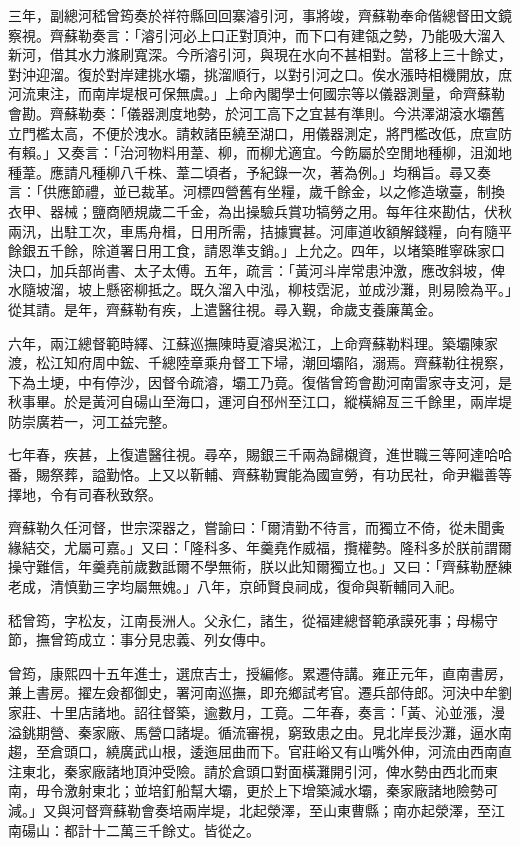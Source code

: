 \begin{pinyinscope}
三年，副總河嵇曾筠奏於祥符縣回回寨濬引河，事將竣，齊蘇勒奉命偕總督田文鏡察視。齊蘇勒奏言：「濬引河必上口正對頂沖，而下口有建瓴之勢，乃能吸大溜入新河，借其水力滌刷寬深。今所濬引河，與現在水向不甚相對。當移上三十餘丈，對沖迎溜。復於對岸建挑水壩，挑溜順行，以對引河之口。俟水漲時相機開放，庶河流東注，而南岸堤根可保無虞。」上命內閣學士何國宗等以儀器測量，命齊蘇勒會勘。齊蘇勒奏：「儀器測度地勢，於河工高下之宜甚有準則。今洪澤湖滾水壩舊立門檻太高，不便於洩水。請敕諸臣繞至湖口，用儀器測定，將門檻改低，庶宣防有賴。」又奏言：「治河物料用葦、柳，而柳尤適宜。今飭屬於空閒地種柳，沮洳地種葦。應請凡種柳八千株、葦二頃者，予紀錄一次，著為例。」均稱旨。尋又奏言：「供應節禮，並已裁革。河標四營舊有坐糧，歲千餘金，以之修造墩臺，制換衣甲、器械；鹽商陋規歲二千金，為出操驗兵賞功犒勞之用。每年往來勘估，伏秋兩汛，出駐工次，車馬舟楫，日用所需，拮據實甚。河庫道收額解錢糧，向有隨平餘銀五千餘，除道署日用工食，請恩準支銷。」上允之。四年，以堵築睢寧硃家口決口，加兵部尚書、太子太傅。五年，疏言：「黃河斗岸常患沖激，應改斜坡，俾水隨坡溜，坡上懸密柳抵之。既久溜入中泓，柳枝霑泥，並成沙灘，則易險為平。」從其請。是年，齊蘇勒有疾，上遣醫往視。尋入覲，命歲支養廉萬金。

六年，兩江總督範時繹、江蘇巡撫陳時夏濬吳淞江，上命齊蘇勒料理。築壩陳家渡，松江知府周中鋐、千總陸章乘舟督工下埽，潮回壩陷，溺焉。齊蘇勒往視察，下為土埂，中有停沙，因督令疏濬，壩工乃竟。復偕曾筠會勘河南雷家寺支河，是秋事畢。於是黃河自碭山至海口，運河自邳州至江口，縱橫綿亙三千餘里，兩岸堤防崇廣若一，河工益完整。

七年春，疾甚，上復遣醫往視。尋卒，賜銀三千兩為歸櫬資，進世職三等阿達哈哈番，賜祭葬，謚勤恪。上又以靳輔、齊蘇勒實能為國宣勞，有功民社，命尹繼善等擇地，令有司春秋致祭。

齊蘇勒久任河督，世宗深器之，嘗諭曰：「爾清勤不待言，而獨立不倚，從未聞夤緣結交，尤屬可嘉。」又曰：「隆科多、年羹堯作威福，攬權勢。隆科多於朕前謂爾操守難信，年羹堯前歲數詆爾不學無術，朕以此知爾獨立也。」又曰：「齊蘇勒歷練老成，清慎勤三字均屬無媿。」八年，京師賢良祠成，復命與靳輔同入祀。

嵇曾筠，字松友，江南長洲人。父永仁，諸生，從福建總督範承謨死事；母楊守節，撫曾筠成立：事分見忠義、列女傳中。

曾筠，康熙四十五年進士，選庶吉士，授編修。累遷侍講。雍正元年，直南書房，兼上書房。擢左僉都御史，署河南巡撫，即充鄉試考官。遷兵部侍郎。河決中牟劉家莊、十里店諸地。詔往督築，逾數月，工竟。二年春，奏言：「黃、沁並漲，漫溢銚期營、秦家廠、馬營口諸堤。循流審視，窮致患之由。見北岸長沙灘，逼水南趨，至倉頭口，繞廣武山根，逶迤屈曲而下。官莊峪又有山嘴外伸，河流由西南直注東北，秦家廠諸地頂沖受險。請於倉頭口對面橫灘開引河，俾水勢由西北而東南，毋令激射東北；並培釘船幫大壩，更於上下增築減水壩，秦家廠諸地險勢可減。」又與河督齊蘇勒會奏培兩岸堤，北起滎澤，至山東曹縣；南亦起滎澤，至江南碭山：都計十二萬三千餘丈。皆從之。


\end{pinyinscope}
